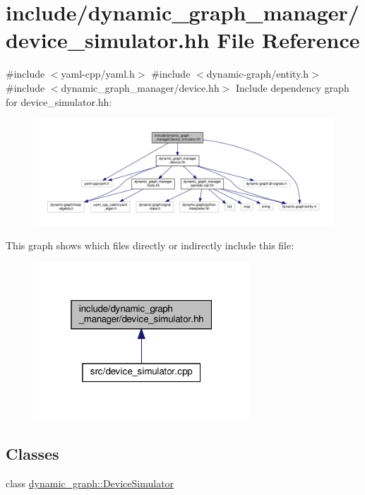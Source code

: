 \hypertarget{device__simulator_8hh}{}\section{include/dynamic\+\_\+graph\+\_\+manager/device\+\_\+simulator.hh File Reference}
\label{device__simulator_8hh}
{\ttfamily \#include $<$yaml-\/cpp/yaml.\+h$>$}\newline
{\ttfamily \#include $<$dynamic-\/graph/entity.\+h$>$}\newline
{\ttfamily \#include $<$dynamic\+\_\+graph\+\_\+manager/device.\+hh$>$}\newline
Include dependency graph for device\+\_\+simulator.\+hh\+:
\nopagebreak
\begin{figure}[H]
\begin{center}
\leavevmode
\includegraphics[width=350pt]{device__simulator_8hh__incl}
\end{center}
\end{figure}
This graph shows which files directly or indirectly include this file\+:
\nopagebreak
\begin{figure}[H]
\begin{center}
\leavevmode
\includegraphics[width=229pt]{device__simulator_8hh__dep__incl}
\end{center}
\end{figure}
\subsection*{Classes}
\begin{DoxyCompactItemize}
\item 
class \hyperlink{classdynamic__graph_1_1DeviceSimulator}{dynamic\+\_\+graph\+::\+Device\+Simulator}
\end{DoxyCompactItemize}
